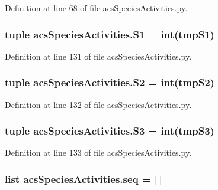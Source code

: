 Definition at line 68 of file acs\-Species\-Activities.\-py.

\hypertarget{a00097_a4ffac9566fa24baa2b27ccd97f9ffe1e}{
\subsubsection[{S1}]{\setlength{\rightskip}{0pt plus 5cm}tuple acs\-Species\-Activities.\-S1 = int(tmp\-S1)}}\label{a00097_a4ffac9566fa24baa2b27ccd97f9ffe1e}


Definition at line 131 of file acs\-Species\-Activities.\-py.

\hypertarget{a00097_a3b95f66d848ccbac2740be2878b2499b}{
\subsubsection[{S2}]{\setlength{\rightskip}{0pt plus 5cm}tuple acs\-Species\-Activities.\-S2 = int(tmp\-S2)}}\label{a00097_a3b95f66d848ccbac2740be2878b2499b}


Definition at line 132 of file acs\-Species\-Activities.\-py.

\hypertarget{a00097_a654d2a657cf4b354b3791a8b2de3d74e}{
\subsubsection[{S3}]{\setlength{\rightskip}{0pt plus 5cm}tuple acs\-Species\-Activities.\-S3 = int(tmp\-S3)}}\label{a00097_a654d2a657cf4b354b3791a8b2de3d74e}


Definition at line 133 of file acs\-Species\-Activities.\-py.

\hypertarget{a00097_a50a8f7f4bae0fd037961d91206f5178c}{
\subsubsection[{seq}]{\setlength{\rightskip}{0pt plus 5cm}list acs\-Species\-Activities.\-seq = \mbox{[}$\,$\mbox{]}}}\label{a00097_a50a8f7f4bae0fd037961d91206f5178c}


